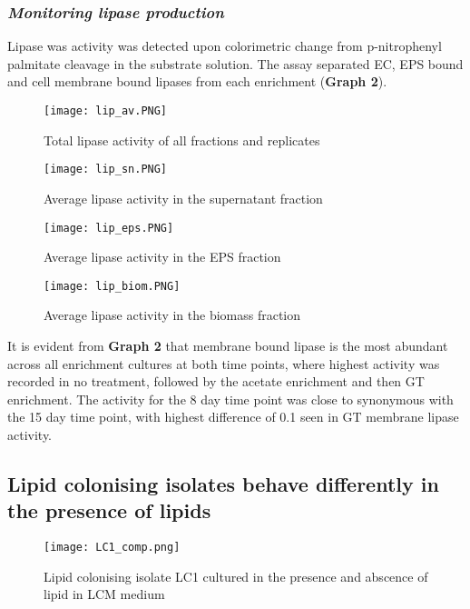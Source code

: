 \documentclass[11pt]{article}
\begin{document}
\subsubsection{\emph{Monitoring lipase production}}
Lipase was activity was detected upon colorimetric change from p-nitrophenyl palmitate cleavage in the substrate solution. The assay separated  EC, EPS bound and cell membrane bound lipases from each enrichment (\textbf{Graph 2}).

\begin{figure}
\texttt{[image: lip\_av.PNG]}
\caption{Total lipase activity of all fractions and replicates}
\end{figure}

\begin{figure}
\texttt{[image: lip\_sn.PNG]}
\caption{Average lipase activity in the supernatant fraction}
\end{figure}

\begin{figure}
\texttt{[image: lip\_eps.PNG]}
\caption{Average lipase activity in the EPS fraction}
\end{figure}

\begin{figure}
\texttt{[image: lip\_biom.PNG]}
\caption{Average lipase activity in the biomass fraction}
\end{figure}



It is evident from  \textbf{Graph 2} that membrane bound lipase is the most abundant across all enrichment cultures at both time points, where highest activity was recorded in no treatment, followed by the acetate enrichment and then GT enrichment.  The activity for the 8 day time point was close to synonymous with the 15 day time point, with highest difference of 0.1 seen in GT membrane lipase activity.

\subsection{Lipid colonising isolates behave differently in the presence of lipids}

\begin{figure}
\texttt{[image: LC1\_comp.png]}
\caption{Lipid colonising isolate LC1 cultured in the presence and abscence of lipid in LCM medium}
\end{figure}
\end{document}
